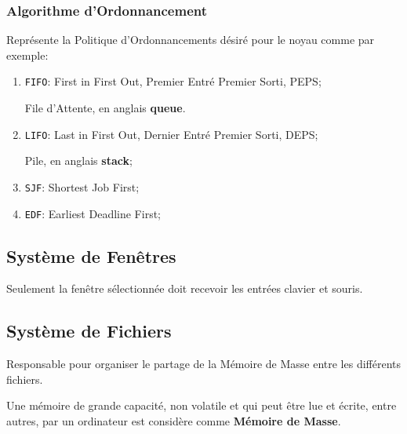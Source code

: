 \documentclass{article}
\begin{document}
\subsubsection{Algorithme d'Ordonnancement}
\begin{definition}\label{def:algorithmeOrdonnancement}
    Représente la Politique d'Ordonnancements désiré pour le noyau comme par exemple:
    \begin{enumerate}[noitemsep, rightmargin = \leftmargin]
        \item \texttt{FIFO}: First in First Out, Premier Entré Premier Sorti, PEPS;
        \begin{example}\label{def:queue}
            File d'Attente, en anglais \textbf{queue}.
        \end{example}
        \item \texttt{LIFO}: Last in First Out, Dernier Entré Premier Sorti, DEPS;
        \begin{example}\label{def:stack}
            Pile, en anglais \textbf{stack};
        \end{example}
        \item \texttt{SJF}: Shortest Job First;
        \item \texttt{EDF}: Earliest Deadline First;
    \end{enumerate}
\end{definition}


\subsection{Système de Fenêtres}
\begin{definition}\label{def:systemeFenetres}
    Seulement la fenêtre sélectionnée doit recevoir les entrées clavier et souris.
\end{definition}

\subsection{Système de Fichiers}
\begin{definition}\label{def:systemeFichiers}
    Responsable pour organiser le partage de la Mémoire de Masse entre les différents fichiers.

    \begin{remark}
        Une mémoire de grande capacité, non volatile et qui peut être lue et écrite, entre autres, par un ordinateur est considère comme \textbf{Mémoire de Masse}.
    \end{remark}
\end{definition}
\end{document}
